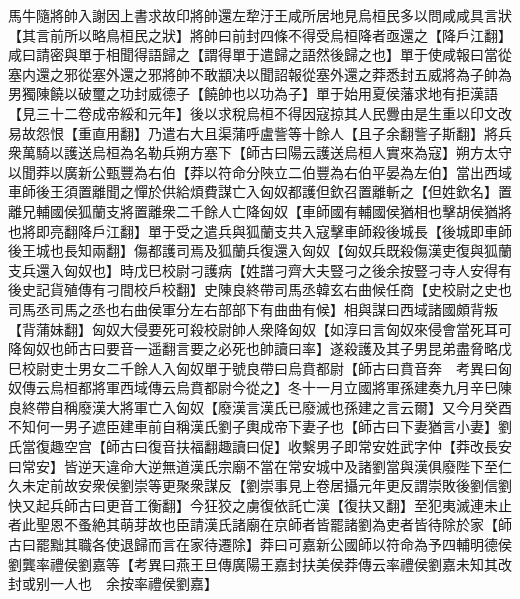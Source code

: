 馬牛隨將帥入謝因上書求故印將帥還左犂汙王咸所居地見烏桓民多以問咸咸具言狀【其言前所以略鳥桓民之狀】將帥曰前封四條不得受烏桓降者亟還之【降戶江翻】咸曰請密與單于相聞得語歸之【謂得單于遣歸之語然後歸之也】單于使咸報曰當從塞内還之邪從塞外還之邪將帥不敢顓决以聞詔報從塞外還之莽悉封五威將為子帥為男獨陳饒以破璽之功封威德子【饒帥也以功為子】單于始用夏侯藩求地有拒漢語【見三十二卷成帝綏和元年】後以求稅烏桓不得因寇掠其人民釁由是生重以印文改易故怨恨【重直用翻】乃遣右大且渠蒲呼盧訾等十餘人【且子余翻訾子斯翻】將兵衆萬騎以護送烏桓為名勒兵朔方塞下【師古曰陽云護送烏桓人實來為寇】朔方太守以聞莽以廣新公甄豐為右伯【莽以符命分陜立二伯豐為右伯平晏為左伯】當出西域車師後王須置離聞之憚於供給煩費謀亡入匈奴都護但欽召置離斬之【但姓欽名】置離兄輔國侯狐蘭支將置離衆二千餘人亡降匈奴【車師國有輔國侯猶相也擊胡侯猶將也將即亮翻降戶江翻】單于受之遣兵與狐蘭支共入寇擊車師殺後城長【後城即車師後王城也長知兩翻】傷都護司焉及狐蘭兵復還入匈奴【匈奴兵既殺傷漢吏復與狐蘭支兵還入匈奴也】時戊巳校尉刁護病【姓譜刁齊大夫豎刁之後余按豎刁寺人安得有後史記貨殖傳有刁間校戶校翻】史陳良終帶司馬丞韓玄右曲候任商【史校尉之史也司馬丞司馬之丞也右曲侯軍分左右部部下有曲曲有候】相與謀曰西域諸國頗背叛【背蒲妹翻】匈奴大侵要死可殺校尉帥人衆降匈奴【如淳曰言匈奴來侵會當死耳可降匈奴也師古曰要音一遥翻言要之必死也帥讀曰率】遂殺護及其子男昆弟盡脅略戊巳校尉吏士男女二千餘人入匈奴單于號良帶曰烏賁都尉【師古曰賁音奔　考異曰匈奴傳云烏桓都將軍西域傳云烏賁都尉今從之】冬十一月立國將軍孫建奏九月辛巳陳良終帶自稱廢漢大將軍亡入匈奴【廢漢言漢氏已廢滅也孫建之言云爾】又今月癸酉不知何一男子遮臣建車前自稱漢氏劉子輿成帝下妻子也【師古曰下妻猶言小妻】劉氏當復趣空宫【師古曰復音扶福翻趣讀曰促】收繫男子即常安姓武字仲【莽改長安曰常安】皆逆天違命大逆無道漢氏宗廟不當在常安城中及諸劉當與漢俱廢陛下至仁久未定前故安衆侯劉崇等更聚衆謀反【劉崇事見上卷居攝元年更反謂崇敗後劉信劉快又起兵師古曰更音工衡翻】今狂狡之虜復依託亡漢【復扶又翻】至犯夷滅連未止者此聖恩不蚤絶其萌芽故也臣請漢氏諸廟在京師者皆罷諸劉為吏者皆待除於家【師古曰罷黜其職各使退歸而言在家待遷除】莽曰可嘉新公國師以符命為予四輔明德侯劉龔率禮侯劉嘉等【考異曰燕王旦傳廣陽王嘉封扶美侯莽傳云率禮侯劉嘉未知其改封或别一人也　余按率禮侯劉嘉】


